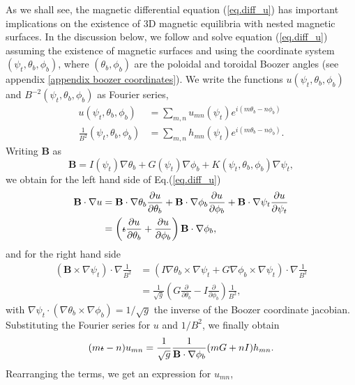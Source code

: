 \documentclass[my_thesis.tex]{subfiles}
\begin{document}
As we shall see, the magnetic differential equation (\ref{eq.diff_u}) has important implications on the existence of 3D magnetic equilibria with nested magnetic surfaces. In the discussion below, we follow \citet{Helander2014} and solve equation (\ref{eq.diff_u}) assuming the existence of magnetic surfaces and using the coordinate system $(\psi_t,\theta_b,\phi_b)$, where $(\theta_b,\phi_b)$ are the poloidal and toroidal Boozer angles (see appendix \ref{appendix boozer coordinates}). We write the functions $u(\psi_t,\theta_b,\phi_b)$ and $B^{-2}(\psi_t,\theta_b,\phi_b)$ as Fourier series,
\begin{align}
	u(\psi_t,\theta_b,\phi_b) &= \sum_{m,n} u_{mn}(\psi_t) e^{i(m\theta_b-n\phi_b)}\\
	\frac{1}{B^2}(\psi_t,\theta_b,\phi_b) &= \sum_{m,n} h_{mn}(\psi_t) e^{i(m\theta_b-n\phi_b)}.
\end{align}
Writing $\mathbf{B}$ as
\begin{equation}
	\mathbf{B} = I(\psi_t)\nabla\theta_b + G(\psi_t)\nabla\phi_b + K(\psi_t,\theta_b,\phi_b)\nabla\psi_t,
\end{equation}
we obtain for the left hand side of Eq.(\ref{eq.diff_u})
\begin{align}
	\mathbf{B}\cdot\nabla u &= \mathbf{B}\cdot\nabla\theta_b\frac{\partial u}{\partial \theta_b} + \mathbf{B}\cdot\nabla\phi_b\frac{\partial u}{\partial \phi_b} + \mathbf{B}\cdot\nabla\psi_t\frac{\partial u}{\partial \psi_t} \\
	&= \left(\text{$\iota\!\!$-} \frac{\partial u}{\partial \theta_b} + \frac{\partial u}{\partial \phi_b}\right)\mathbf{B}\cdot\nabla\phi_b,
\end{align}
and for the right hand side
\begin{align}
	\left(\mathbf{B}\times\nabla\psi_t\right)\cdot\nabla \frac{1}{B^2} &= \left(I\nabla\theta_b\times\nabla\psi_t + G\nabla\phi_b\times\nabla\psi_t\right)\cdot\nabla\frac{1}{B^2}\\
	&= \frac{1}{\sqrt{g}}\left(G\frac{\partial}{\partial\theta_b} - I \frac{\partial}{\partial \phi_b}\right)\frac{1}{B^2},
\end{align}
with $\nabla\psi_t\cdot(\nabla\theta_b\times\nabla\phi_b) = 1/\sqrt{g}$ the inverse of the Boozer coordinate jacobian. Substituting the Fourier series for $u$ and $1/B^2$, we finally obtain
\begin{equation}
	(m\text{$\iota\!\!$-} - n)u_{mn} = \frac{1}{\sqrt{g}}\frac{1}{\mathbf{B}\cdot\nabla\phi_b}(mG + nI)h_{mn}.
\end{equation}
Rearranging the terms, we get an expression for $u_{mn}$,
\end{document}
